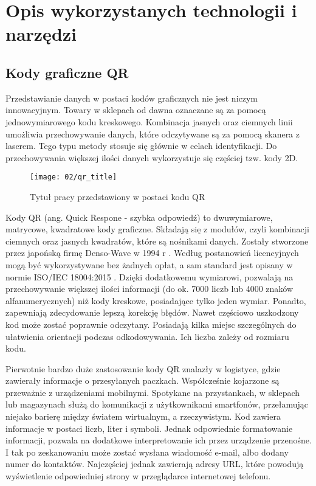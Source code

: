 \section{Opis wykorzystanych technologii i narzędzi}


\subsection{Kody graficzne QR}
Przedstawianie danych w postaci kodów graficznych nie jest niczym innowacyjnym. Towary w sklepach od dawna oznaczane są za pomocą jednowymiarowego kodu kreskowego. Kombinacja jasnych oraz ciemnych linii umożliwia przechowywanie danych, które odczytywane są za pomocą skanera z laserem. Tego typu metody stosuje się głównie w celach identyfikacji. Do przechowywania większej ilości danych wykorzystuje się częściej tzw. kody 2D.
 
\begin{wrapfigure}[10]{r}{0.25\textwidth}
	\vspace{-15pt}
	\begin{center}
		\texttt{[image: 02/qr\_title]}
	\end{center}
	\vspace{-10pt}
	\caption{Tytuł pracy przedstawiony w postaci kodu QR}
	\vspace{-10pt}
\end{wrapfigure}

Kody QR (ang. Quick Respone - szybka odpowiedź) to dwuwymiarowe, matrycowe, kwadratowe kody graficzne. Składają się z modułów, czyli kombinacji ciemnych oraz jasnych kwadratów, które są nośnikami danych. Zostały stworzone przez japońską firmę Denso-Wave w 1994 r \cite{thonky_tutorial}. Według postanowień licencyjnych mogą być wykorzystywane bez żadnych opłat, a sam standard jest opisany w normie ISO/IEC 18004:2015 \cite{norma_qr}. Dzięki dodatkowemu wymiarowi, pozwalają na przechowywanie większej ilości informacji (do ok. 7000 liczb lub 4000 znaków alfanumerycznych) niż kody kreskowe, posiadające tylko jeden wymiar. Ponadto, zapewniają zdecydowanie lepszą korekcję błędów. Nawet częściowo uszkodzony kod może zostać poprawnie odczytany. Posiadają kilka miejsc szczególnych do ułatwienia orientacji podczas odkodowywania. Ich liczba zależy od rozmiaru kodu.

Pierwotnie bardzo duże zastosowanie kody QR znalazły w logistyce, gdzie zawierały informacje o przesyłanych paczkach. Współcześnie kojarzone są przeważnie z urządzeniami mobilnymi. Spotykane na przystankach, w sklepach lub magazynach służą do komunikacji z użytkownikami smartfonów, przełamując niejako barierę między światem wirtualnym, a rzeczywistym. Kod zawiera informacje w postaci liczb, liter i symboli. Jednak odpowiednie formatowanie informacji, pozwala na dodatkowe interpretowanie ich przez urządzenie przenośne. I tak po zeskanowaniu może zostać wysłana wiadomość e-mail, albo dodany numer do kontaktów. Najczęściej jednak zawierają adresy URL, które powodują wyświetlenie odpowiedniej strony w przeglądarce internetowej telefonu.

